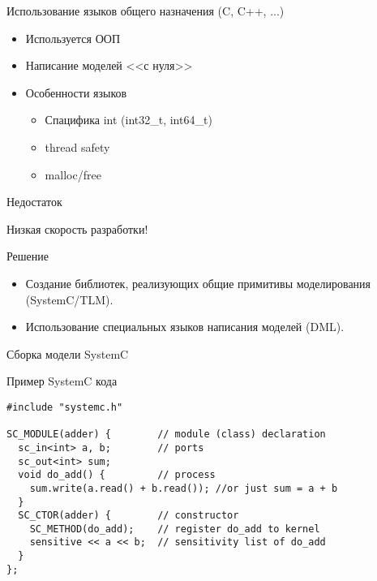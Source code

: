 \begin{frame}{Использование языков общего назначения (C, C++, ...)}

\begin{itemize}
  \item Используется ООП
  \item Написание моделей <<с нуля>>
  \item Особенности языков
  \begin{itemize}
    \item Спацифика int (int32\_t, int64\_t)
    \item thread safety
    \item malloc/free
  \end{itemize}
\end{itemize}

\end{frame}

\begin{frame}{Недостаток}

Низкая скорость разработки!

\end{frame}

\begin{frame}{Решение}

\begin{itemize}
  \item Создание библиотек, реализующих общие примитивы моделирования (SystemC/TLM).
  \item Использование специальных языков написания моделей (DML).
\end{itemize}

\end{frame}

\begin{frame}{Сборка модели SystemC}

\begin{figure}[htp]
    \centering
\end{figure}

\end{frame}

\begin{frame}[fragile]{Пример SystemC кода}

\begin{lstlisting}[basicstyle=\footnotesize]
#include "systemc.h"

SC_MODULE(adder) {        // module (class) declaration
  sc_in<int> a, b;        // ports
  sc_out<int> sum;
  void do_add() {         // process
    sum.write(a.read() + b.read()); //or just sum = a + b
  }
  SC_CTOR(adder) {        // constructor
    SC_METHOD(do_add);    // register do_add to kernel
    sensitive << a << b;  // sensitivity list of do_add
  }
};
\end{lstlisting}

\end{frame}

